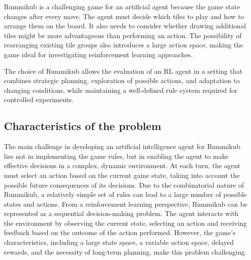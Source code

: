 Rummikub is a challenging game for an artificial agent because the game state changes after every move. The agent must decide which tiles to play and how to arrange them on the board. It also needs to consider whether drawing additional tiles might be more advantageous than performing an action. The possibility of rearranging existing tile groups also introduces a large action space, making the game ideal for investigating reinforcement learning approaches.

The choice of Rummikub allows the evaluation of an RL agent in a setting that combines strategic planning, exploration of possible actions, and adaptation to changing conditions, while maintaining a well-defined rule system required for controlled experiments.



\subsection{Characteristics of the problem}
The main challenge in developing an artificial intelligence agent for Rummikub lies not in implementing the game rules, but in enabling the agent to make effective decisions in a complex, dynamic environment. At each turn, the agent must select an action based on the current game state, taking into account the possible future consequences of its decisions. Due to the combinatorial nature of Rummikub, a relatively simple set of rules can lead to a large number of possible states and actions.
From a reinforcement learning perspective, Rummikub can be represented as a sequential decision-making problem. The agent interacts with the environment by observing the current state, selecting an action and receiving feedback based on the outcome of the action performed. However, the game's characteristics, including a large state space, a variable action space, delayed rewards, and the necessity of long-term planning, make this problem challenging.


